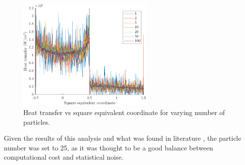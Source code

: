 \begin{figure}[h]
    \centering
    \includegraphics[width=0.6\textwidth]{Images/3. Methodology/Fnum convergence/fnumconv.pdf}
    \caption{Heat transfer vs square equivalent coordinate for varying number of particles.}
    \label{fig:fnumsec}
\end{figure}

Given the results of this analysis and what was found in literature \cite{fnum1, fnum2}, the particle number was set to 25, as it was thought to be a good balance between computational cost and statistical noise.

